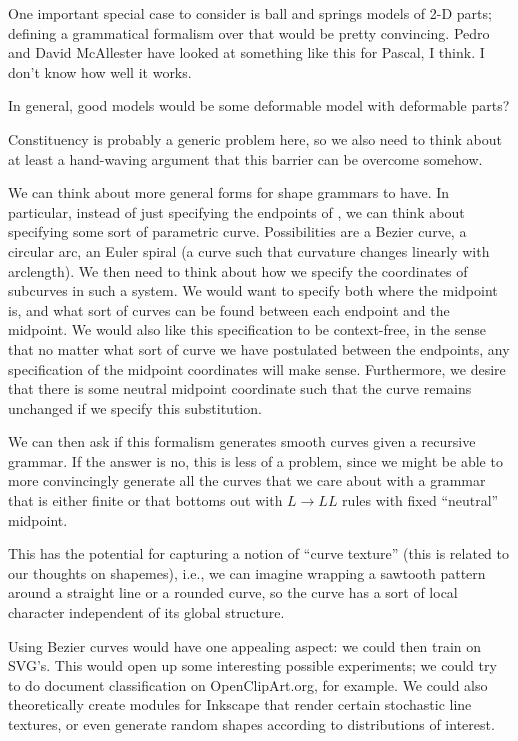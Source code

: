 \documentclass{article}
\begin{document}
  One important special case to consider is ball and springs models of
  2-D parts; defining a grammatical formalism over that would be
  pretty convincing. Pedro and David McAllester have looked at
  something like this for Pascal, I think. I don't know how well it works.

  In general, good models would be some deformable model with
  deformable parts?

  Constituency is probably a generic problem here, so we also need to
  think about at least a hand-waving argument that this barrier can be overcome somehow.

\item We can think about more general forms for shape grammars to
  have. In particular, instead of just specifying the endpoints of
  , we can think about specifying some sort of parametric
  curve. Possibilities are a Bezier curve, a circular arc, an Euler
  spiral (a curve such that curvature changes linearly with
  arclength). We then need to think about how we specify the
  coordinates of subcurves in such a system. We would want to specify
  both where the midpoint is, and what sort of curves can be found
  between each endpoint and the midpoint. We would also like this
  specification to be context-free, in the sense that no matter what
  sort of curve we have postulated between the endpoints, any
  specification of the midpoint coordinates will make
  sense. Furthermore, we desire that there is some neutral midpoint
  coordinate such that the curve remains unchanged if we specify this
  substitution.

  We can then ask if this formalism generates smooth curves given a
  recursive grammar. If the answer is no, this is less of a problem,
  since we might be able to more convincingly generate all the curves
  that we care about with a grammar that is either finite or that
  bottoms out with $L\to LL$ rules with fixed ``neutral'' midpoint.

  This has the potential for capturing a notion of ``curve texture''
  (this is related to our thoughts on shapemes), i.e., we can imagine
  wrapping a sawtooth pattern around a straight line or a rounded
  curve, so the curve has a sort of local character independent of its
  global structure.

  Using Bezier curves would have one appealing aspect: we could then
  train on SVG's. This would open up some interesting possible
  experiments; we could try to do document classification on
  OpenClipArt.org, for example. We could also theoretically create
  modules for Inkscape that render certain stochastic line textures,
  or even generate random shapes according to distributions of
  interest.
\end{document}
